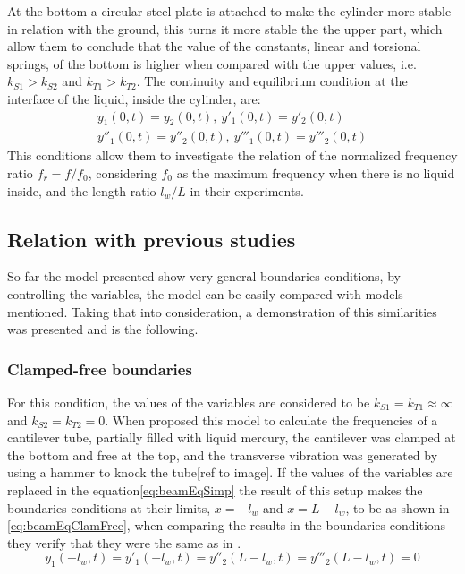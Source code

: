 At the bottom a circular steel plate is attached to make the cylinder more stable in relation with the ground, this turns it more stable the the upper part, which allow them to conclude that the value of the constants, linear and torsional springs, of the bottom is higher when compared with the upper values, i.e. $k_{S1}>k_{S2}$ and $k_{T1}>k_{T2}$. The continuity and equilibrium condition at the interface of the liquid, inside the cylinder, are:
\begin{equation} \label{eq:beamEqEquilCond}
    \begin{split}
        y_1(0,t) = y_2(0,t),\> y'_1(0,t) = y'_2(0,t) \\
        y''_1(0,t) = y''_2(0,t),\> y'''_1(0,t) = y'''_2(0,t)
    \end{split}
\end{equation}
This conditions allow them to investigate the relation of the normalized frequency ratio $f_r=f/f_0$, considering $f_0$ as the maximum frequency when there is no liquid inside, and the length ratio $l_w/L$ in their experiments.

\subsection{Relation with previous studies}
So far the model presented show very general boundaries conditions, by controlling the variables, the model can be easily compared with models mentioned. Taking that into consideration, a demonstration of this similarities was presented and is the following.
    \subsubsection{Clamped-free boundaries}
    For this condition, the values of the variables are considered to be $k_{S1}=k_{T1}\approx\infty$ and $k_{S2}=k_{T2}=0$. When \citeauthor{chanFreeVibrationCantilever1995} proposed this model to calculate the frequencies of a cantilever tube, partially filled with liquid mercury, the cantilever was clamped at the bottom and free at the top, and the transverse vibration was generated by using a hammer to knock the tube[ref to image]. 
    If the values of the variables are replaced in the equation\ref{eq:beamEqSimp} the result of this setup makes the boundaries conditions at their limits, $x=-l_w$ and $x=L-l_w$, to be as shown in \ref{eq:beamEqClamFree}, when comparing the results in the boundaries conditions they verify that they were the same as in \cite{chanFreeVibrationCantilever1995}.
    \begin{equation} \label{eq:beamEqClamFree}
            y_1(-l_w,t) = y'_1(-l_w,t) = y''_2(L-l_w,t) = y'''_2(L-l_w,t)=0
    \end{equation}
